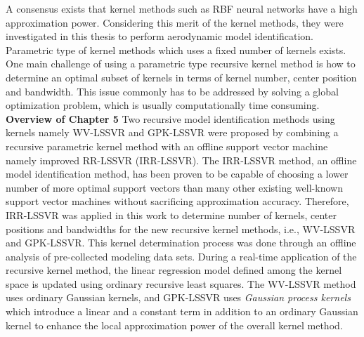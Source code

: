 \begin{shaded}
\end{shaded}
\vspace{-0.95cm}
\begin{shaded}
\end{shaded}

A consensus exists that kernel methods such as RBF neural networks have a high approximation power. Considering this merit of the kernel methods, they were investigated in this thesis to perform aerodynamic model identification. Parametric type of kernel methods which uses a fixed number of kernels exists. One main challenge of using a parametric type recursive kernel method is how to determine an optimal subset of kernels in terms of kernel number, center position and bandwidth. This issue commonly has to be addressed by solving a global optimization problem, which is usually computationally time consuming.\\

\noindent \textbf{Overview of Chapter 5}  Two recursive model identification methods using kernels namely WV-LSSVR and GPK-LSSVR were proposed by combining a recursive parametric kernel method with an offline support vector machine namely improved \ac{RR-LSSVR} (\ac{IRR-LSSVR}). The \ac{IRR-LSSVR} method, an offline model identification method, has been proven to be capable of choosing a lower number of more optimal support vectors than many other existing well-known support vector machines without sacrificing approximation accuracy. Therefore, \ac{IRR-LSSVR} was applied in this work to determine number of kernels, center positions and bandwidths for the new recursive kernel methods, i.e., WV-LSSVR and GPK-LSSVR. This kernel determination process was done through an offline analysis of pre-collected modeling data sets. During a real-time application of the recursive kernel method, the linear regression model defined among the kernel space is updated using ordinary recursive least squares.  The WV-LSSVR method uses ordinary Gaussian kernels, and GPK-LSSVR uses \textit{Gaussian process kernels} which introduce a linear and a constant term in addition to an ordinary Gaussian kernel to enhance the local approximation power of the overall kernel method. \\

